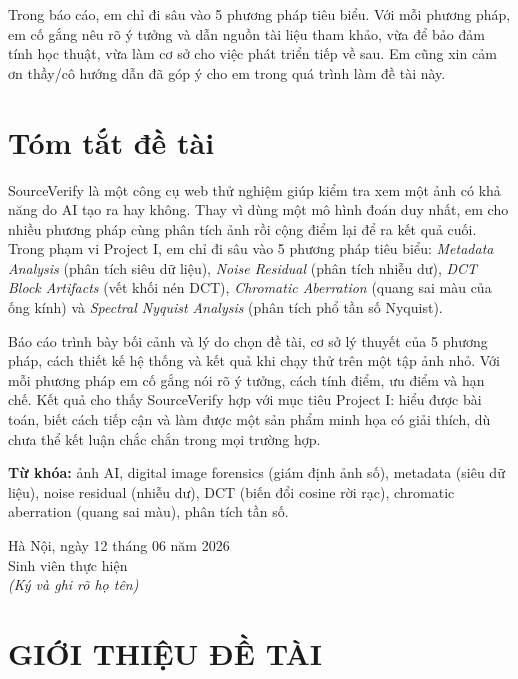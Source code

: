 \documentclass[14pt,a4paper,oneside]{report}
\begin{document}
Trong báo cáo, em chỉ đi sâu vào 5 phương pháp tiêu biểu. Với mỗi phương pháp, em cố gắng nêu rõ ý tưởng và dẫn nguồn tài liệu tham khảo, vừa để bảo đảm tính học thuật, vừa làm cơ sở cho việc phát triển tiếp về sau. Em cũng xin cảm ơn thầy/cô hướng dẫn đã góp ý cho em trong quá trình làm đề tài này.

\clearpage

\chapter*{Tóm tắt đề tài}
SourceVerify là một công cụ web thử nghiệm giúp kiểm tra xem một ảnh có khả năng do AI tạo ra hay không. Thay vì dùng một mô hình đoán duy nhất, em cho nhiều phương pháp cùng phân tích ảnh rồi cộng điểm lại để ra kết quả cuối. Trong phạm vi Project I, em chỉ đi sâu vào 5 phương pháp tiêu biểu: \textit{Metadata Analysis} (phân tích siêu dữ liệu), \textit{Noise Residual} (phân tích nhiễu dư), \textit{DCT Block Artifacts} (vết khối nén DCT), \textit{Chromatic Aberration} (quang sai màu của ống kính) và \textit{Spectral Nyquist Analysis} (phân tích phổ tần số Nyquist).

Báo cáo trình bày bối cảnh và lý do chọn đề tài, cơ sở lý thuyết của 5 phương pháp, cách thiết kế hệ thống và kết quả khi chạy thử trên một tập ảnh nhỏ. Với mỗi phương pháp em cố gắng nói rõ ý tưởng, cách tính điểm, ưu điểm và hạn chế. Kết quả cho thấy SourceVerify hợp với mục tiêu Project I: hiểu được bài toán, biết cách tiếp cận và làm được một sản phẩm minh họa có giải thích, dù chưa thể kết luận chắc chắn trong mọi trường hợp.

\textbf{Từ khóa:} ảnh AI, digital image forensics (giám định ảnh số), metadata (siêu dữ liệu), noise residual (nhiễu dư), DCT (biến đổi cosine rời rạc), chromatic aberration (quang sai màu), phân tích tần số.

\begin{flushright}
Hà Nội, ngày 12 tháng 06 năm 2026\\
\vspace{1cm}
Sinh viên thực hiện\\
\textit{(Ký và ghi rõ họ tên)}
\end{flushright}

\tableofcontents
\listoffigures
\listoftables
\clearpage

\setcounter{page}{1}

\chapter{GIỚI THIỆU ĐỀ TÀI}
\end{document}
